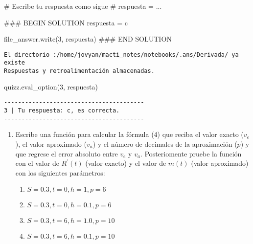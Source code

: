 \documentclass[
  letterpaper,
  DIV=11,
  numbers=noendperiod]{scrreprt}
\newenvironment{Shaded}{\begin{snugshade}}{\end{snugshade}}
\newcommand{\CommentTok}[1]{\textcolor[rgb]{0.37,0.37,0.37}{#1}}
\newcommand{\NormalTok}[1]{\textcolor[rgb]{0.00,0.23,0.31}{#1}}
\newcommand{\OperatorTok}[1]{\textcolor[rgb]{0.37,0.37,0.37}{#1}}
\newcommand{\RegionMarkerTok}[1]{\textcolor[rgb]{0.00,0.23,0.31}{#1}}
\newcommand{\StringTok}[1]{\textcolor[rgb]{0.13,0.47,0.30}{#1}}
\providecommand{\tightlist}{%
  \setlength{\itemsep}{0pt}\setlength{\parskip}{0pt}}\usepackage{longtable,booktabs,array}
\begin{document}
\begin{Shaded}
\begin{Highlighting}[]
\CommentTok{\# Escribe tu respuesta como sigue }
\CommentTok{\# respuesta = ...}

\CommentTok{\#\#\# }\RegionMarkerTok{BEGIN}\CommentTok{ SOLUTION}
\NormalTok{respuesta }\OperatorTok{=} \StringTok{\textquotesingle{}c\textquotesingle{}}

\NormalTok{file\_answer.write(}\StringTok{\textquotesingle{}3\textquotesingle{}}\NormalTok{, respuesta)}
\CommentTok{\#\#\# }\RegionMarkerTok{END}\CommentTok{ SOLUTION}
\end{Highlighting}
\end{Shaded}

\begin{verbatim}
El directorio :/home/jovyan/macti_notes/notebooks/.ans/Derivada/ ya existe
Respuestas y retroalimentación almacenadas.
\end{verbatim}

\begin{Shaded}
\begin{Highlighting}[]
\NormalTok{quizz.eval\_option(}\StringTok{\textquotesingle{}3\textquotesingle{}}\NormalTok{, respuesta)}
\end{Highlighting}
\end{Shaded}

\begin{verbatim}
----------------------------------------
3 | Tu respuesta: c, es correcta.
----------------------------------------
\end{verbatim}

\begin{enumerate}
\def\labelenumi{\arabic{enumi}.}
\setcounter{enumi}{3}
\item
  Escribe una función para calcular la fórmula (4) que reciba el valor
  exacto (\(v_e\)), el valor aproximado (\(v_a\)) y el número de
  decimales de la aproximación (\(p\)) y que regrese el error absoluto
  entre \(v_e\) y \(v_a\). Posteriomente pruebe la función con el valor
  de \(R^\prime(t)\) (valor exacto) y el valor de \(m(t)\) (valor
  aproximado) con los siguientes parámetros:

  \begin{enumerate}
  \def\labelenumii{\arabic{enumii}.}
  \tightlist
  \item
    \(S = 0.3, t = 0, h = 1, p = 6\)
  \item
    \(S = 0.3, t = 0, h = 0.1, p = 6\)
  \item
    \(S = 0.3, t = 6, h = 1.0, p = 10\)
  \item
    \(S = 0.3, t = 6, h = 0.1, p = 10\)
  \end{enumerate}
\end{enumerate}
\end{document}
